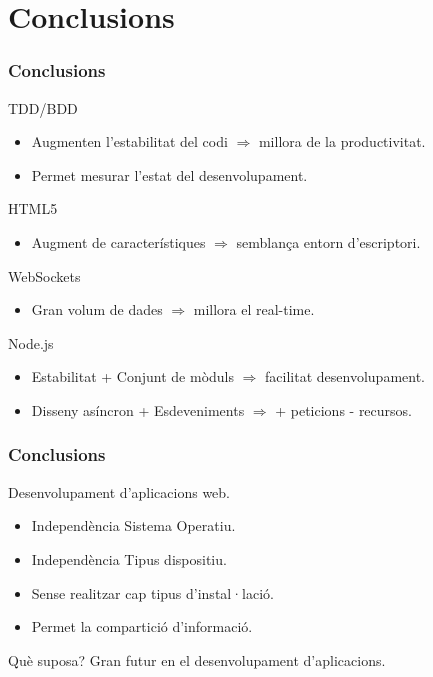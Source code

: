 \documentclass[notitlepage]{beamer}
\begin{document}
\section{Conclusions}
\begin{frame}
\frametitle{Conclusions}
\begin{block}{TDD/BDD}
\begin{itemize}
\item{Augmenten l'estabilitat del codi $\Rightarrow$ millora de la productivitat.}
\item{Permet mesurar l'estat del desenvolupament.}
\end{itemize}
\end{block}

\begin{block}{HTML5}
\begin{itemize}
\item{Augment de característiques $\Rightarrow$ semblança entorn d'escriptori.}
\end{itemize}
\end{block}

\begin{block}{WebSockets}
\begin{itemize}
\item{Gran volum de dades  $\Rightarrow$ millora el real-time.}
\end{itemize}
\end{block}

\begin{block}{Node.js}
\begin{itemize}
\item{Estabilitat + Conjunt de mòduls $\Rightarrow$ facilitat desenvolupament.}
\item{Disseny asíncron + Esdeveniments $\Rightarrow$ + peticions - recursos.}
\end{itemize}
\end{block}
\end{frame}


\begin{frame}
\frametitle{Conclusions}
\begin{block}{Desenvolupament d'aplicacions web.}
\begin{itemize}
\item{Independència Sistema Operatiu.}
\item{Independència Tipus dispositiu.}
\item{Sense realitzar cap tipus d'instal·lació.}
\item{Permet la compartició d'informació.}
\end{itemize}
\end{block}

\begin{block}{Què suposa?}
Gran futur en el desenvolupament d'aplicacions.
\end{block}
\end{frame}
\end{document}
